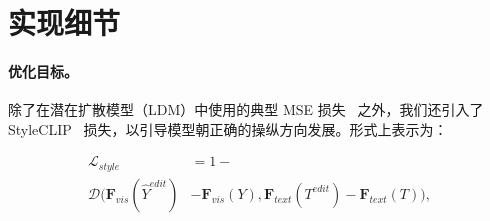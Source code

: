 ﻿\newpage
\clearpage
\appendix
\appendixpage

\section{实现细节}

\paragraph{优化目标。}
除了在潜在扩散模型（LDM）中使用的典型 MSE 损失~\cite{ho2020denoising} 之外，我们还引入了 StyleCLIP~\cite{patashnik2021styleclip} 损失，以引导模型朝正确的操纵方向发展。形式上表示为：

\begin{equation}
\begin{aligned}
    \mathcal{L}_{style} &= 1 - \\
    \mathcal{D}(
    \textbf{F}_{vis}(\hat{Y}^{edit}) &- \textbf{F}_{vis}(Y),
    \textbf{F}_{text}(T^{edit}) - \textbf{F}_{text}(T)),
\end{aligned}
\end{equation}

